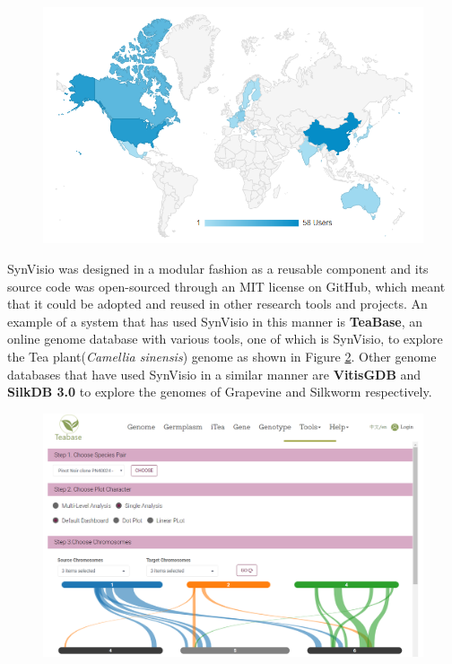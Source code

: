 \begin{figure}
  \centering
  \includegraphics[width=1\linewidth]{images/ch_6_users.PNG}
  \label{fig:ch_6_users}
\end{figure}


SynVisio was designed in a modular fashion as a reusable component and its source code was open-sourced through an MIT license on GitHub\cite{synvisio}, which meant that it could be adopted and reused in other research tools and projects. An example of a system that has used SynVisio in this manner is \textbf{TeaBase}, an online genome database with various tools, one of which is SynVisio, to explore the Tea plant(\textit{Camellia sinensis}) genome as shown in Figure \ref{fig:ch_6_other}\cite{teabase}. Other genome databases that have used SynVisio in a similar manner are \textbf{VitisGDB} and  \textbf{SilkDB 3.0} to explore the genomes of Grapevine and Silkworm respectively\cite{lu2020silkdb,vitisgdb}.

\begin{figure}[h]
  \centering
  \includegraphics[width=1\linewidth]{images/ch_6_other.PNG}
  \label{fig:ch_6_other}
\end{figure}


